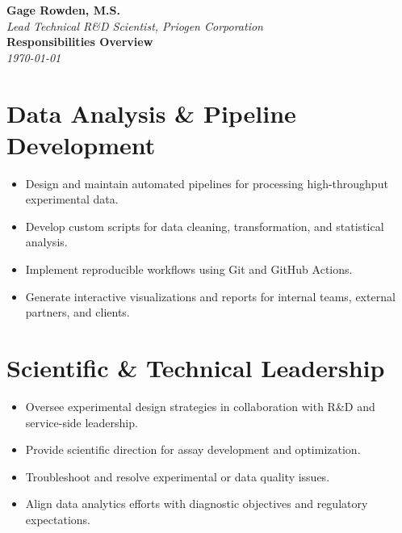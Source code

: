 \documentclass[11pt]{article}
\begin{document}
    \selectfont

    \begin{center}
        {\LARGE\textbf{Gage Rowden, M.S.}}\\
        \vspace{2pt}
        \textit{Lead Technical R\&D Scientist, Priogen Corporation}\\
        \vspace{8pt}
        \textbf{\Large Responsibilities Overview} \\
        \cleanlookdateon\textit{\today}
    \end{center}

    \vspace{0.5cm}

    \section*{Data Analysis \& Pipeline Development}
    \begin{itemize}
        \item Design and maintain automated pipelines for processing high-throughput experimental data.
        \item Develop custom scripts for data cleaning, transformation, and statistical analysis.
        \item Implement reproducible workflows using Git and GitHub Actions.
        \item Generate interactive visualizations and reports for internal teams, external partners, and clients.
    \end{itemize}

    \section*{Scientific \& Technical Leadership}
    \begin{itemize}
        \item Oversee experimental design strategies in collaboration with R\&D and service-side leadership.
        \item Provide scientific direction for assay development and optimization.
        \item Troubleshoot and resolve experimental or data quality issues.
        \item Align data analytics efforts with diagnostic objectives and regulatory expectations.
    \end{itemize}
\end{document}
